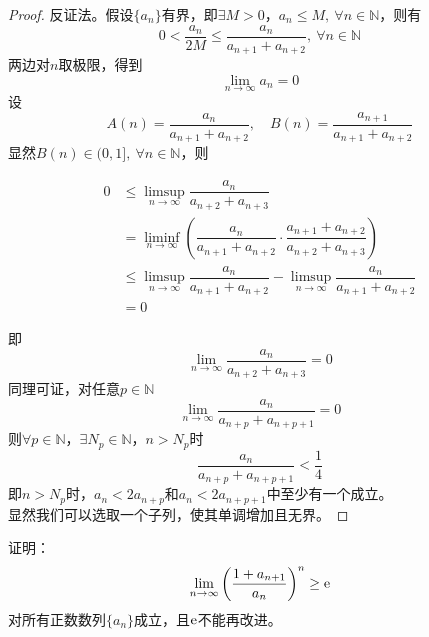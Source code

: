 \begin{proof}
    
    反证法。假设$\{a_n\}$有界，即$\exists M > 0$，$a_n \leq M,\ \forall n \in \mathbb{N}$，则有
    $$0 < \dfrac{a_n}{2M} \leq \dfrac{a_n}{a_{n + 1} + a_{n + 2}}, \ \forall n \in \mathbb{N}$$
    两边对$n$取极限，得到
    $$\lim\limits_{n \to \infty}{a_n} = 0$$
    设
    $$A(n) = \dfrac{a_n}{a_{n + 1} + a_{n + 2}}, \quad B(n) = \dfrac{a_{n + 1}}{a_{n + 1} + a_{n + 2}}$$
    显然$B(n) \in (0,1],\  \forall n \in \mathbb{N}$，则
    
    \begin{align*}
        0 & \leq \limsup_{n \to \infty}{\dfrac{a_n}{a_{n + 2} + a_{n + 3}}} \\
        & = \liminf_{n \to \infty}{\left( \dfrac{a_n}{a_{n + 1} + a_{n + 2}} \cdot \dfrac{a_{n + 1}+a_{n + 2}}{a_{n + 2} + a_{n + 3}} \right)} \\
        & \leq \limsup_{n \to \infty}{\dfrac{a_n}{a_{n + 1} + a_{n + 2}}} - \limsup_{n \to \infty}{\dfrac{a_n}{a_{n + 1} + a_{n + 2}}} \\
        & = 0
    \end{align*}
    
    即
    $$\lim\limits_{n \to \infty}{\dfrac{a_n}{a_{n + 2} + a_{n + 3}}} = 0$$
    同理可证，对任意$p \in \mathbb{N}$
    $$\lim\limits_{n \to \infty}{\dfrac{a_n}{a_{n + p} + a_{n + p + 1}}} = 0$$
    则$\forall p \in \mathbb{N}$，$\exists N_p \in \mathbb{N}$，$n > N_p$时
    $$\dfrac{a_n}{a_{n + p} + a_{n + p + 1}} < \dfrac{1}{4}$$
    即$n > N_p$时，$a_n < 2a_{n + p}$和$a_n < 2a_{n + p + 1}$中至少有一个成立。\\
    显然我们可以选取一个子列，使其单调增加且无界。
    
\end{proof}

\begin{proposition}

    证明：
    $$\lim\limits_{n \to \infty}{\left( \dfrac{1 + a_{n + 1}}{a_n} \right)^n} \geq \mathrm{e}$$
    对所有正数数列$\{a_n\}$成立，且$\mathrm{e}$不能再改进。

\end{proposition}

